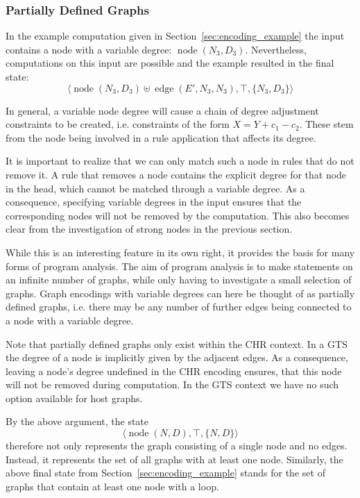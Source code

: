 \documentclass{tlp}
\newcommand{\st}[3]{\ensuremath{\langle #1 , #2 , #3 \rangle}}
\DeclareMathOperator{\node}{node}
\DeclareMathOperator{\edge}{edge}
\begin{document}
\subsubsection{Partially Defined Graphs}
\label{sec:partial}

In the example computation given in Section~\ref{sec:encoding_example} the input
contains a node with a variable degree: $\node(N_3, D_3)$. Nevertheless,
computations on this input are possible and the example resulted in the final
state: \[\st{\node(N_3, D_3) \uplus \edge(E', N_3, N_3)}{\top}{\{N_3,
D_3\}}\]

In general, a variable node degree will cause a chain of degree adjustment
constraints to be created, i.e. constraints of the form $X = Y {+} c_1 {-} c_2$.
These stem from the node being involved in a rule application that affects its
degree.

It is important to realize that we can only match such a node in rules that do
not remove it. A rule that removes a node contains the explicit degree for that
node in the head, which cannot be matched through a variable degree. As a
consequence, specifying variable degrees in the input ensures that the
corresponding nodes will not be removed by the computation. This also becomes
clear from the investigation of strong nodes in the previous section.

While this is an interesting feature in its own right, it provides the basis for
many forms of program analysis. The aim of program analysis is to make statements
on an infinite number of graphs, while only having to investigate a small
selection of graphs. Graph encodings with variable degrees can here be thought of
as partially defined graphs, i.e. there may be any number of further edges being
connected to a node with a variable degree. 

Note that partially defined graphs only exist within the CHR context. In a GTS
the degree of a node is implicitly given by the adjacent edges. As a consequence,
leaving a node's degree undefined in the CHR encoding ensures, that this node
will not be removed during computation. In the GTS context we have no such option
available for host graphs.

By the above argument, the state \[ \st{\node(N, D)}{\top}{\{N,D\}}\] therefore
not only represents the graph consisting of a single node and no edges. Instead,
it represents the set of all graphs with at least one node. Similarly, the above
final state from Section~\ref{sec:encoding_example} stands for the set of graphs
that contain at least one node with a loop.
\end{document}
